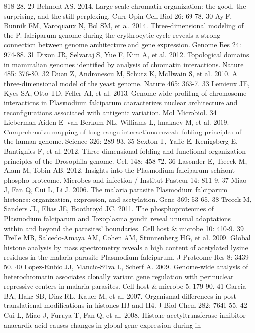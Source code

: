 818-28.
29  Belmont AS. 2014. Large-scale chromatin organization: the good, the
surprising, and the still perplexing. Curr Opin Cell Biol 26: 69-78.
30  Ay F, Bunnik EM, Varoquaux N, Bol SM, et al. 2014. Three-dimensional
modeling of the P. falciparum genome during the erythrocytic cycle reveals a
strong connection between genome architecture and gene expression. Genome Res
24: 974-88.
31  Dixon JR, Selvaraj S, Yue F, Kim A, et al. 2012. Topological domains in
mammalian genomes identified by analysis of chromatin interactions. Nature
485: 376-80.
32  Duan Z, Andronescu M, Schutz K, McIlwain S, et al. 2010. A
three-dimensional model of the yeast genome. Nature 465: 363-7.
33  Lemieux JE, Kyes SA, Otto TD, Feller AI, et al. 2013. Genome-wide
profiling of chromosome interactions in Plasmodium falciparum characterizes
nuclear architecture and reconfigurations associated with antigenic variation.
Mol Microbiol.
34  Lieberman-Aiden E, van Berkum NL, Williams L, Imakaev M, et al. 2009.
Comprehensive mapping of long-range interactions reveals folding principles of
the human genome. Science 326: 289-93.
35  Sexton T, Yaffe E, Kenigsberg E, Bantignies F, et al. 2012.
Three-dimensional folding and functional organization principles of the
Drosophila genome. Cell 148: 458-72.
36  Lasonder E, Treeck M, Alam M, Tobin AB. 2012. Insights into the Plasmodium
falciparum schizont phospho-proteome. Microbes and infection / Institut
Pasteur 14: 811-9.
37  Miao J, Fan Q, Cui L, Li J. 2006. The malaria parasite Plasmodium
falciparum histones: organization, expression, and acetylation. Gene 369:
53-65.
38  Treeck M, Sanders JL, Elias JE, Boothroyd JC. 2011. The phosphoproteomes
of Plasmodium falciparum and Toxoplasma gondii reveal unusual adaptations
within and beyond the parasites' boundaries. Cell host \& microbe 10: 410-9.
39  Trelle MB, Salcedo-Amaya AM, Cohen AM, Stunnenberg HG, et al. 2009. Global
histone analysis by mass spectrometry reveals a high content of acetylated
lysine residues in the malaria parasite Plasmodium falciparum. J Proteome Res
8: 3439-50.
40  Lopez-Rubio JJ, Mancio-Silva L, Scherf A. 2009. Genome-wide analysis of
heterochromatin associates clonally variant gene regulation with perinuclear
repressive centers in malaria parasites. Cell host \& microbe 5: 179-90.
41  Garcia BA, Hake SB, Diaz RL, Kauer M, et al. 2007. Organismal differences
in post-translational modifications in histones H3 and H4. J Biol Chem 282:
7641-55.
42  Cui L, Miao J, Furuya T, Fan Q, et al. 2008. Histone acetyltransferase
inhibitor anacardic acid causes changes in global gene expression during in
